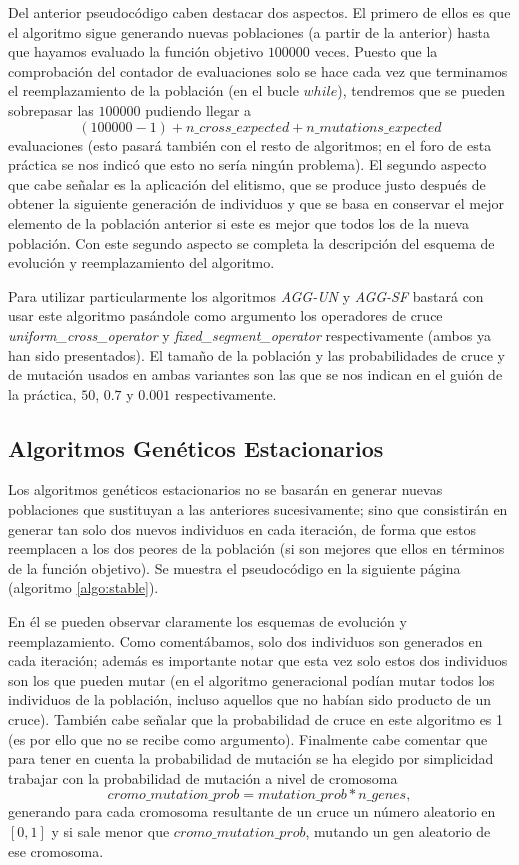 \documentclass[11pt,a4paper]{article}
\begin{document}
	Del anterior pseudocódigo caben destacar dos aspectos. El primero de ellos es que el algoritmo sigue generando nuevas poblaciones (a partir de la anterior) hasta que hayamos evaluado la función objetivo $100000$ veces. Puesto que la comprobación del contador de evaluaciones solo se hace cada vez que terminamos el reemplazamiento de la población (en el bucle $while$), tendremos que se pueden sobrepasar las $100000$ pudiendo llegar a 
	$$(100000 - 1) +  n\_cross\_expected + n\_mutations\_expected$$ evaluaciones (esto pasará también con el resto de algoritmos; en el foro de esta práctica se nos indicó que esto no sería ningún problema). El segundo aspecto que cabe señalar es la aplicación del elitismo, que se produce justo después de obtener la siguiente generación de individuos y que se basa en conservar el mejor elemento de la población anterior si este es mejor que todos los de la nueva población. Con este segundo aspecto se completa la descripción del esquema de evolución y reemplazamiento del algoritmo.
	
	Para utilizar particularmente los algoritmos \textit{AGG-UN} y \textit{AGG-SF} bastará con usar este algoritmo pasándole como argumento los operadores de cruce \textit{uniform\_cross\_operator} y \textit{fixed\_segment\_operator} respectivamente (ambos ya han sido presentados). El tamaño de la población y las probabilidades de cruce y de mutación usados en ambas variantes son las que se nos indican en el guión de la práctica, $50$, $0.7$ y $0.001$ respectivamente.
	
	\subsection{Algoritmos Genéticos Estacionarios}
	Los algoritmos genéticos estacionarios no se basarán en generar nuevas poblaciones que sustituyan a las anteriores sucesivamente; sino que consistirán en generar tan solo dos nuevos individuos en cada iteración, de forma que estos reemplacen a los dos peores de la población (si son mejores que ellos en términos de la función objetivo). Se muestra el pseudocódigo en la siguiente página (algoritmo \ref{algo:stable}). 
	
	En él se pueden observar claramente los esquemas de evolución y reemplazamiento. Como comentábamos, solo dos individuos son generados en cada iteración; además es importante notar que esta vez solo estos dos individuos son los que pueden mutar (en el algoritmo generacional podían mutar todos los individuos de la población, incluso aquellos que no habían sido producto de un cruce). También cabe señalar que la probabilidad de cruce en este algoritmo es 1 (es por ello que no se recibe como argumento). Finalmente cabe comentar que para tener en cuenta la probabilidad de mutación se ha elegido por simplicidad trabajar con la probabilidad de mutación a nivel de cromosoma $$cromo\_mutation\_prob = mutation\_prob * n\_genes,$$
	generando para cada cromosoma resultante de un cruce un número aleatorio en $[0,1]$ y si sale menor que $cromo\_mutation\_prob$, mutando un gen aleatorio de ese cromosoma.
	
\end{document}
